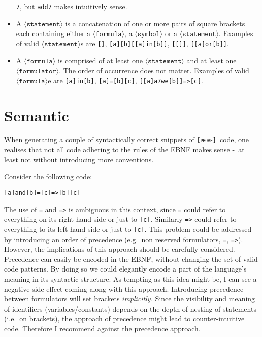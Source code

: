 \documentclass[british]{article}
\newcommand\prv{bc}
\newcommand\m[1]{\texttt{#1}}
\newcommand\name{\texttt{\textsc{[prove]}}}
\begin{document}
\begin{itemize}
		\m{7}, but \m{add7} makes intuitively sense.
	\item
		A $\langle\texttt{statement}\rangle$ is a concatenation of one or more
		pairs of square brackets each containing either a
		$\langle\texttt{formula}\rangle$, a $\langle\texttt{symbol}\rangle$ or a
		$\langle\texttt{statement}\rangle$.  Examples of valid
		$\langle\texttt{statement}\rangle$s are \m{[]}, \m{[a][b][[a]in[b]]},
		\m{[[]]}, \m{[[a]or[b]]}.  \item A $\langle\texttt{formula}\rangle$ is
		comprised of at least one $\langle\texttt{statement}\rangle$ and at
		least one $\langle\texttt{formulator}\rangle$. The order of occurrence
		does not matter. Examples of valid $\langle\texttt{formula}\rangle$e are
		\m{[a]in[b]}, \m{[a]=[b][c]}, \m{[[a]a7we[b]]=>[c]}.
\end{itemize}

\section{Semantic}

When generating a couple of syntactically correct snippets of \name\
code, one realises that not all code adhering to the rules of the
EBNF makes sense -\ at least not without introducing more conventions.

\medskip{}

Consider the following code:

\begin{verbatim}
[a]and[b]=[c]=>[b][c]
\end{verbatim}

The use of \m{=} and \m{=>} is ambiguous in this context, since
\m{=} could refer to everything on its right hand side or just to
\m{[c]}. Similarly \m{=>} could refer to everything to its left
hand side or just to \m{[c]}. This problem could be addressed by
introducing an order of precedence (e.g.\ non reserved formulators,
\m{=}, \m{=>}). However, the implications of this approach should
be carefully considered. Precedence can easily be encoded in the EBNF,
without changing the set of valid code patterns. By doing so we could
elegantly encode a part of the language's meaning in its syntactic
structure. As tempting as this idea might be, I can see a negative
side effect coming along with this approach. Introducing precedence
between formulators will set brackets \textit{implicitly. }Since the
visibility and meaning of identifiers (variables/constants) depends
on the depth of nesting of statements (i.e.\ on brackets), the approach
of precedence might lead to counter-intuitive code. Therefore I recommend
against the precedence approach.
\end{document}
